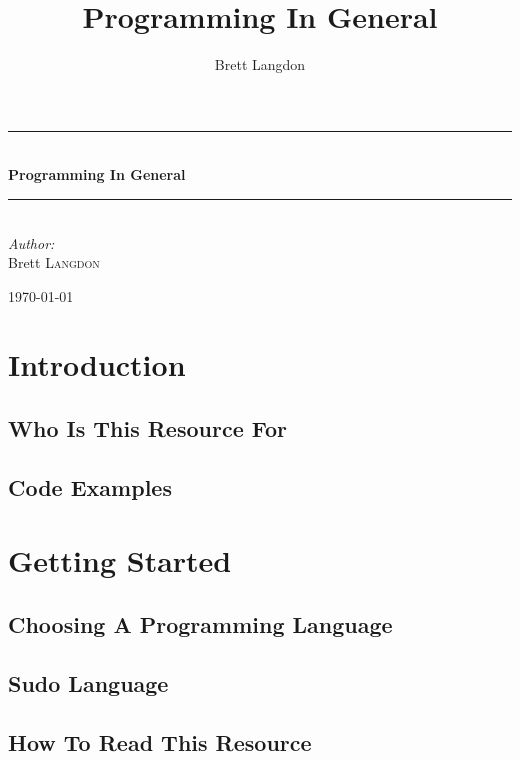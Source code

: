 \documentclass[10pt,a4paper,titlepage]{book}
\author{Brett Langdon}
\title{Programming In General}
\newcommand{\HRule}{\rule{\linewidth}{0.5mm}}
\begin{document}
\begin{titlepage}
\begin{center}

\vspace*{3 in}

\HRule \\[0.4cm]
{\huge \bfseries Programming In General}
\HRule \\[0.4cm]

\emph{Author:}\\
Brett \textsc{Langdon}

\vfill

{\large \today}

\end{center}
\end{titlepage}

\tableofcontents

\chapter{Introduction}

\vfill
\pagebreak
\section{Who Is This Resource For}


\section{Code Examples}


\chapter{Getting Started}

\vfill
\pagebreak
\section{Choosing A Programming Language}


\section{Sudo Language}


\section{How To Read This Resource}

\end{document}
